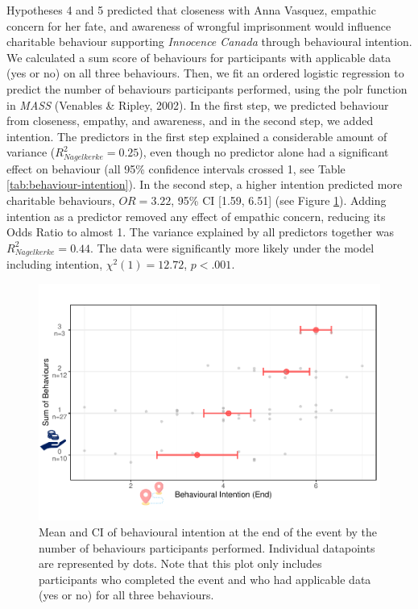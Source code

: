 \documentclass[
  man,floatsintext]{apa6}
\begin{document}
Hypotheses 4 and 5 predicted that closeness with Anna Vasquez, empathic concern for her fate, and awareness of wrongful imprisonment would influence charitable behaviour supporting \emph{Innocence Canada} through behavioural intention. We calculated a sum score of behaviours for participants with applicable data (yes or no) on all three behaviours. Then, we fit an ordered logistic regression to predict the number of behaviours participants performed, using the polr function in \emph{MASS} (Venables \& Ripley, 2002). In the first step, we predicted behaviour from closeness, empathy, and awareness, and in the second step, we added intention. The predictors in the first step explained a considerable amount of variance (\(R_{Nagelkerke}^2 = 0.25\)), even though no predictor alone had a significant effect on behaviour (all 95\% confidence intervals crossed 1, see Table \ref{tab:behaviour-intention}). In the second step, a higher intention predicted more charitable behaviours, \(OR = 3.22\), 95\% CI {[}1.59, 6.51{]} (see Figure \ref{fig:behaviour-intentionplot}). Adding intention as a predictor removed any effect of empathic concern, reducing its Odds Ratio to almost 1. The variance explained by all predictors together was \(R_{Nagelkerke}^2 = 0.44\). The data were significantly more likely under the model including intention, \(\chi^2 (1) = 12.72\), \(p < .001\).



\begin{figure}
\includegraphics[width=1\linewidth]{Schlichting_MSc_Thesis_files/figure-latex/behaviour-intentionplot-1} \caption{Mean and CI of behavioural intention at the end of the event by the number of behaviours participants performed. Individual datapoints are represented by dots. Note that this plot only includes participants who completed the event and who had applicable data (yes or no) for all three behaviours.}\label{fig:behaviour-intentionplot}
\end{figure}
\end{document}
